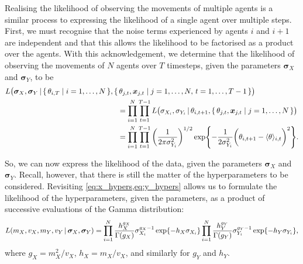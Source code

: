 Realising the likelihood of observing the movements of multiple agents is a similar process to expressing the likelihood of a single agent over multiple steps. First, we must recognise that the noise terms experienced by agents $i$ and $i+1$ are independent and that this allows the likelihood to be factorised as a product over the agents. With this acknowledgement, we determine that the likelihood of observing the movements of $N$ agents over $T$ timesteps, given the parameters $\bm{\sigma}_X$ and $\bm{\sigma}_Y$, to be
\begin{align}
\label{eq:data_likelihood}
\begin{split}
	L\big(\bm{\sigma}_X, \bm{\sigma}_Y  \,|\, \{\,\theta_{i, T} \mid i=1,\ldots,N\,\},  \{&\,\theta_{j, t}, \bm{x}_{j, t} \mid j= 1,\ldots, N, \, t=1,  \ldots,T-1\,\}\big) \\
	& = \prod_{i=1}^N \prod_{t=1}^{T-1} L\big(\sigma_{X_i}, \sigma_{Y_i} \,|\, \theta_{i, t+1},  \{\,\theta_{j, t}, \bm{x}_{j, t} \mid j=1,\ldots,N\,\}\big) \\
	& = \prod_{i=1}^N \prod_{t=1}^{T-1} \bigg( \frac{1}{2\pi\sigma_{Y_i}^2} \bigg)^{1/2} \exp{-\frac{1}{2\sigma_{Y_i}^2} \bigg(\theta_{i, t+1} - \langle \theta \rangle_{i, t}\bigg)^2 }.
\end{split}
\end{align}

So, we can now express the likelihood of the data, given the parameters $\bm{\sigma}_X$ and $\bm{\sigma}_Y$. Recall, however, that there is still the matter of the hyperparameters to be considered. Revisiting \cref{eq:x_hypers,eq:y_hypers} allows us to formulate the likelihood of the hyperparameters, given the parameters, as a product of successive evaluations of the Gamma distribution:
\begin{equation}
\label{eq:param_likelihood}
	L(m_X, v_X, m_Y, v_Y \,|\, \bm{\sigma}_X, \bm{\sigma}_Y) = \prod_{i=1}^N \frac{h_X^{g_X}}{\Gamma(g_X)} \sigma_{X_i}^{g_X - 1} \exp{-h_X \sigma_{X_i}}  \prod_{i=1}^N \frac{h_Y^{g_Y}}{\Gamma(g_Y)} \sigma_{Y_i}^{g_Y - 1} \exp{-h_Y \sigma_{Y_i}},
\end{equation}
where $g_X = m_X^2 / v_X$, $h_X = m_X / v_X$, and similarly for $g_Y$ and $h_Y$.

